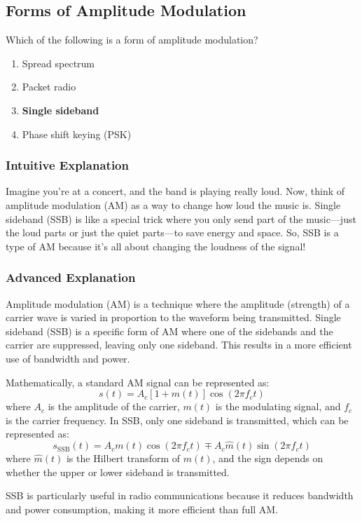 \subsection{Forms of Amplitude Modulation}
\label{T8A01}

\begin{tcolorbox}[colback=gray!10!white,colframe=black!75!black,title=T8A01]
Which of the following is a form of amplitude modulation?
\begin{enumerate}[label=\Alph*)]
    \item Spread spectrum
    \item Packet radio
    \item \textbf{Single sideband}
    \item Phase shift keying (PSK)
\end{enumerate}
\end{tcolorbox}

\subsubsection{Intuitive Explanation}
Imagine you’re at a concert, and the band is playing really loud. Now, think of amplitude modulation (AM) as a way to change how loud the music is. Single sideband (SSB) is like a special trick where you only send part of the music—just the loud parts or just the quiet parts—to save energy and space. So, SSB is a type of AM because it’s all about changing the loudness of the signal!

\subsubsection{Advanced Explanation}
Amplitude modulation (AM) is a technique where the amplitude (strength) of a carrier wave is varied in proportion to the waveform being transmitted. Single sideband (SSB) is a specific form of AM where one of the sidebands and the carrier are suppressed, leaving only one sideband. This results in a more efficient use of bandwidth and power.

Mathematically, a standard AM signal can be represented as:
\[
s(t) = A_c [1 + m(t)] \cos(2\pi f_c t)
\]
where \( A_c \) is the amplitude of the carrier, \( m(t) \) is the modulating signal, and \( f_c \) is the carrier frequency. In SSB, only one sideband is transmitted, which can be represented as:
\[
s_{\text{SSB}}(t) = A_c m(t) \cos(2\pi f_c t) \mp A_c \hat{m}(t) \sin(2\pi f_c t)
\]
where \( \hat{m}(t) \) is the Hilbert transform of \( m(t) \), and the sign depends on whether the upper or lower sideband is transmitted.

SSB is particularly useful in radio communications because it reduces bandwidth and power consumption, making it more efficient than full AM.

